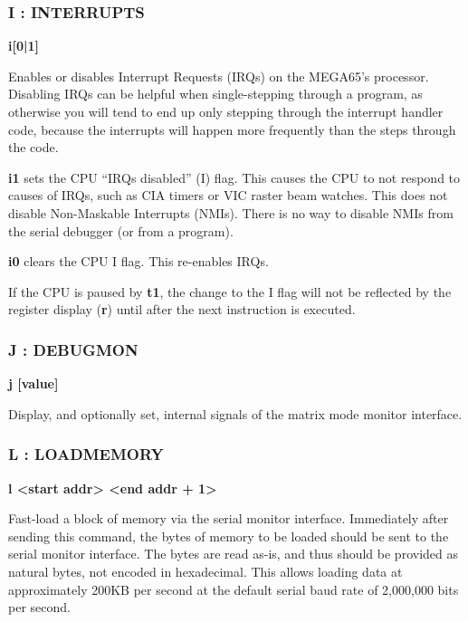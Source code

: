 \subsubsection{I : INTERRUPTS}
\begin{description}[leftmargin=2cm,style=nextline]
\item [Format:] {\bf i[0|1]}
\item [Usage:] Enables or disables Interrupt Requests (IRQs) on the MEGA65's
  processor. Disabling IRQs can be helpful when single-stepping
  through a program, as otherwise you will tend to end up only
  stepping through the interrupt handler code, because the interrupts
  will happen more frequently than the steps through the code.

  {\bf i1} sets the CPU ``IRQs disabled'' (I) flag. This causes the CPU to not respond to causes of IRQs, such as CIA timers or VIC raster beam watches. This does not disable Non-Maskable Interrupts (NMIs). There is no way to disable NMIs from the serial debugger (or from a program).

  {\bf i0} clears the CPU I flag. This re-enables IRQs.

\item [Remarks:] If the CPU is paused by {\bf t1}, the change to the I flag will not be reflected by the register display ({\bf r}) until after the next instruction is executed.

\end{description}

\subsubsection{J : DEBUGMON}
\begin{description}[leftmargin=2cm,style=nextline]
\item [Format:] {\bf j [value]}
\item [Usage:] Display, and optionally set, internal signals of the matrix
  mode monitor interface.

\end{description}


\subsubsection{L : LOADMEMORY}
\begin{description}[leftmargin=2cm,style=nextline]
\item [Format:] {\bf l <start addr> <end addr + 1>}
\item [Usage:] Fast-load a block of memory via the serial monitor
  interface.  Immediately after sending this command, the bytes of
  memory to be loaded should be sent to the serial monitor interface.
  The bytes are read as-is, and thus should be provided as natural
  bytes, not encoded in hexadecimal.  This allows loading data at
  approximately 200KB per second at the default serial baud rate
  of 2,000,000 bits per second.

\end{description}

